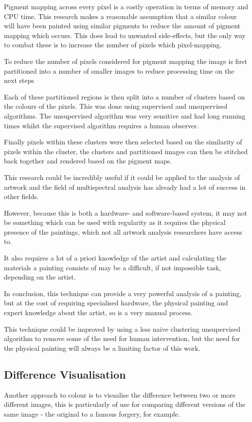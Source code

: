 \documentclass[conference]{IEEEtran}
\begin{document}
Pigment mapping across every pixel is a costly operation in terms of memory and
CPU time. This research makes a reasonable assumption that a similar colour
will have been painted using similar pigments to reduce the amount of pigment
mapping which occurs. This does lead to unwanted side-effects, but the only way
to combat these is to increase the number of pixels which pixel-mapping.

To reduce the number of pixels considered for pigment mapping the image is
first partitioned into a number of smaller images to reduce processing time on
the next steps

Each of these partitioned regions is then split into a number of clusters based
on the colours of the pixels. This was done using supervised and unsupervised
algorithms. The unsupervised algorithm was very sensitive and had long running
times whilst the supervised algorithm requires a human observer.

Finally pixels within these clusters were then selected based on the similarity
of pixels within the cluster, the clusters and partitioned images can then be
stitched back together and rendered based on the pigment maps.

This research could be incredibly useful if it could be applied to the analysis
of artwork and the field of multispectral analysis has already had a lot of
success in other fields.

However, because this is both a hardware- and software-based system, it may not
be something which can be used with regularity as it requires the physical
presence of the paintings, which not all artwork analysis researchers have
access to.

It also requires a lot of a priori knowledge of the artist and calculating the
materials a painting consists of may be a difficult, if not impossible task,
depending on the artist.

In conclusion, this technique can provide a very powerful analysis of a
painting, but at the cost of requiring specialised hardware, the physical
painting and expert knowledge about the artist, so is a very manual process.

This technique could be improved by using a less naive clustering unsupervised
algorithm to remove some of the need for human intervention, but the need for
the physical painting will always be a limiting factor of this work.

\subsection{Difference Visualisation}
Another approach to colour is to visualise the difference between two or more
different images, this is particularly of use for comparing different versions
of the same image - the original to a famous forgery, for example.
\end{document}
